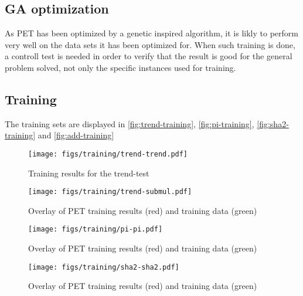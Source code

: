 \subsection{GA optimization}
As PET has been optimized by a genetic inspired algorithm, it is likly to perform very well on the data sets it
has been optimized for. When such training is done, a controll test is needed in order to verify that the result
is good for the general problem solved, not only the specific instances used for training.

\subsection{Training}

The training sets are displayed in \autoref{fig:trend-training},
\autoref{fig:pi-training}, \autoref{fig:sha2-training} and
\autoref{fig:add-training}

\begin{figure}[ht]
\centering
\texttt{[image: figs/training/trend-trend.pdf]}
\caption{Training results for the trend-test}
\label{fig:trend-training}
\end{figure}
\begin{figure}[ht]
\centering
\texttt{[image: figs/training/trend-submul.pdf]}
\caption{Overlay of PET training results (red) and training data (green)}
\label{fig:submul-training}
\end{figure}
\begin{figure}[ht]
\centering
\texttt{[image: figs/training/pi-pi.pdf]}
\caption{Overlay of PET training results (red) and training data (green)}
\label{fig:pi-training}
\end{figure}
\begin{figure}[ht]
\centering
\texttt{[image: figs/training/sha2-sha2.pdf]}
\caption{Overlay of PET training results (red) and training data (green)}
\label{fig:sha2-training}
\end{figure}

